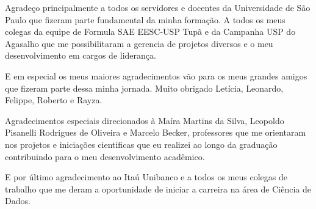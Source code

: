 Agradeço principalmente a todos os servidores e docentes da Universidade de São Paulo que fizeram parte fundamental da minha formação.
A todos os meus colegas da equipe de Formula SAE EESC-USP Tupã e da Campanha USP do Agasalho que me possibilitaram a gerencia de projetos diversos e o meu desenvolvimento em cargos de liderança.

E em especial os meus maiores agradecimentos vão para os meus grandes amigos que fizeram parte dessa minha jornada. Muito obrigado Letícia, Leonardo, Felippe, Roberto e Rayza.


Agradecimentos especiais direcionados à Maíra Martins da Silva, Leopoldo Pisanelli Rodrigues de Oliveira e Marcelo Becker, professores que me orientaram nos projetos e iniciações cientificas que eu realizei ao longo da graduação contribuindo para o meu desenvolvimento acadêmico.

E por último agradecimento ao Itaú Unibanco e a todos os meus colegas de trabalho que me deram a oportunidade de iniciar a carreira na área de Ciência de Dados.